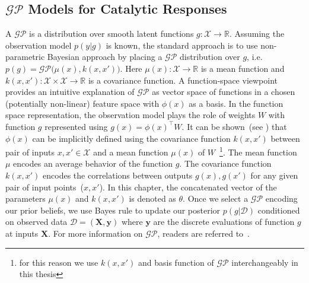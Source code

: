 \subsection{\(\mathcal{GP}\) Models for Catalytic Responses}
A \(\mathcal{GP}\) is a distribution over smooth latent functions \(g: \mathcal{X} \rightarrow \mathbb{R}\). 
Assuming the observation model \(p(y\vert g)\) is known, the standard approach is to use non-parametric Bayesian approach by placing a \(\mathcal{GP}\) distribution over \(g\), i.e. \(p(g)=\mathcal{GP}\big(\mu(x),k(x,x')\big)\). 
Here \(\mu(x):\mathcal{X}\rightarrow \mathbb{R}\) is a mean function and \(k(x,x'):\mathcal{X}\times\mathcal{X}\rightarrow \mathbb{R}\) is a covariance function. 
A function-space viewpoint provides an intuitive explanation of \(\mathcal{GP}\) as vector space of functions in a chosen (potentially non-linear) feature space with \(\phi(x)\) as a basis. 
In the function space representation, the observation model plays the role of weights \(W\) with function \(g\) represented using \(g(x) = \phi(x)^{\top}W\). 
It can be shown~(see ) that \(\phi(x)\) can be implicitly defined using the covariance function \(k(x,x')\) between pair of inputs \(x,x'\in\mathcal{X}\) and a mean function \(\mu(x)\) of \(W\)~\footnote{for this reason we use \(k(x,x')\) and basis function of \(\mathcal{GP}\) interchangeably in this thesis}. 
The mean function \(\mu\) encodes an average behavior of the function \(g\). 
The covariance function \(k(x,x')\) encodes the correlations between outputs \(g(x), g(x')\) for any given pair of input points~(\(x,x'\)). 
In this chapter, the concatenated vector of the parameters \(\mu(x)\) and \(k(x,x')\) is denoted as \(\theta\).
Once we select a \(\mathcal{GP}\) encoding our prior beliefs, we use Bayes rule to update our posterior \(p(g\vert \mathcal{D})\) conditioned on observed data \(\mathcal{D}=(\textbf{X},\textbf{y})\) where \(\textbf{y}\) are the discrete evaluations of function \(g\) at inputs \(\textbf{X}\). 
For more information on \(\mathcal{GP}\), readers are referred to~\cite{williams2006gaussian}.

